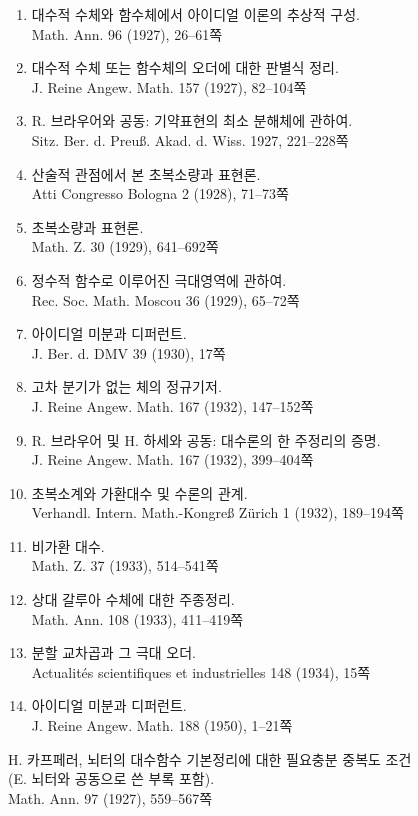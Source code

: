\begin{enumerate}
Nachr. v. d. Ges. d. Wiss. zu Göttingen 1926, 28--35쪽
\item 대수적 수체와 함수체에서 아이디얼 이론의 추상적 구성.\\
Math. Ann. 96 (1927), 26--61쪽
\item 대수적 수체 또는 함수체의 오더에 대한 판별식 정리.\\
J. Reine Angew. Math. 157 (1927), 82--104쪽
\item R. 브라우어와 공동: 기약표현의 최소 분해체에 관하여.\\
Sitz. Ber. d. Preuß. Akad. d. Wiss. 1927, 221--228쪽
\item 산술적 관점에서 본 초복소량과 표현론.\\
Atti Congresso Bologna 2 (1928), 71--73쪽
\item[34.] 초복소량과 표현론.\\
Math. Z. 30 (1929), 641--692쪽
\item[35.] 정수적 함수로 이루어진 극대영역에 관하여.\\
Rec. Soc. Math. Moscou 36 (1929), 65--72쪽
\item[36.] 아이디얼 미분과 디퍼런트.\\
J. Ber. d. DMV 39 (1930), 17쪽
\item[37.] 고차 분기가 없는 체의 정규기저.\\
J. Reine Angew. Math. 167 (1932), 147--152쪽
\item[38.] R. 브라우어 및 H. 하세와 공동: 대수론의 한 주정리의 증명.\\
J. Reine Angew. Math. 167 (1932), 399--404쪽
\item[39.] 초복소계와 가환대수 및 수론의 관계.\\
Verhandl. Intern. Math.-Kongreß Zürich 1 (1932), 189--194쪽
\item[40.] 비가환 대수.\\
Math. Z. 37 (1933), 514--541쪽
\item[41.] 상대 갈루아 수체에 대한 주종정리.\\
Math. Ann. 108 (1933), 411--419쪽
\item[42.] 분할 교차곱과 그 극대 오더.\\
Actualités scientifiques et industrielles 148 (1934), 15쪽
\item[43.] 아이디얼 미분과 디퍼런트.\\
J. Reine Angew. Math. 188 (1950), 1--21쪽
\end{enumerate}

\noindent H. 카프페러, 뇌터의 대수함수 기본정리에 대한 필요충분 중복도 조건\\
(E. 뇌터와 공동으로 쓴 부록 포함).\\
Math. Ann. 97 (1927), 559--567쪽

